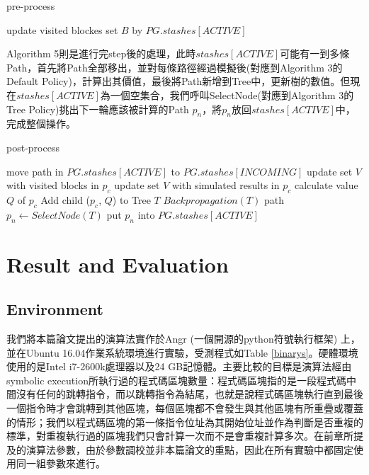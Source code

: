 \documentclass[12pt,a4paper,oneside]{book}
\begin{document}
\begin{algorithm}[htbp]
  \caption{pre-process}
  \begin{algorithmic}[1]
    	\State update visited blockes set $B$ by $PG.stashes[ACTIVE]$
    \EndFunction
  \end{algorithmic}
\end{algorithm}

Algorithm 5則是進行完step後的處理，此時$stashes[ACTIVE]$可能有一到多條Path，首先將Path全部移出，並對每條路徑經過模擬後(對應到Algorithm 3的Default Policy)，計算出其價值，最後將Path新增到Tree中，更新樹的數值。但現在$stashes[ACTIVE]$為一個空集合，我們呼叫SelectNode(對應到Algorithm 3的Tree Policy)挑出下一輪應該被計算的Path $p_n$，將$p_n$放回$stashes[ACTIVE]$中，完成整個操作。

\begin{algorithm}[htbp]
  \caption{post-process}
  \begin{algorithmic}[1]
    	\State move path in $PG.stashes[ACTIVE]$ to $PG.stashes[INCOMING]$
        	\State update set $V$ with visited blocks in $p_c$
            \State update set $V$ with simulated results in $p_c$
            \State calculate value $Q$ of $p_c$
            \State Add child ($p_c$, $Q$) to Tree $T$ 
        \EndFor
        \State $Backpropagation(T)$
        \State path $p_n \leftarrow SelectNode(T)$
        \State put $p_n$ into $PG.stashes[ACTIVE]$
    \EndFunction
  \end{algorithmic}
\end{algorithm}

\chapter{Result and Evaluation}

\section{Environment}

我們將本篇論文提出的演算法實作於Angr (一個開源的python符號執行框架) \cite{angr}上，並在Ubuntu 16.04作業系統環境進行實驗，受測程式如Table \ref{binarys}。硬體環境使用的是Intel i7-2600k處理器以及24 GB記憶體。主要比較的目標是演算法經由symbolic execution所執行過的程式碼區塊數量：程式碼區塊指的是一段程式碼中間沒有任何的跳轉指令，而以跳轉指令為結尾，也就是說程式碼區塊執行直到最後一個指令時才會跳轉到其他區塊，每個區塊都不會發生與其他區塊有所重疊或覆蓋的情形；我們以程式碼區塊的第一條指令位址為其開始位址並作為判斷是否重複的標準，對重複執行過的區塊我們只會計算一次而不是會重複計算多次。在前章所提及的演算法參數，由於參數調校並非本篇論文的重點，因此在所有實驗中都固定使用同一組參數來進行。
\end{document}
